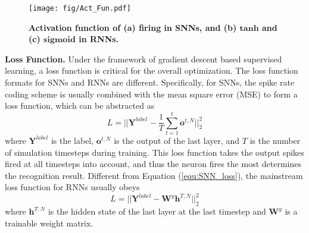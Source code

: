 \documentclass[journal,10pt,twocolumn]{IEEETran}
\begin{document}
\begin{figure}[!htbp]
\centering     
\texttt{[image: fig/Act\_Fun.pdf]}
\flushleft
\caption{\textbf{Activation function of (a) firing in SNNs, and (b) $\pmb{tanh}$ and (c) $\pmb{sigmoid}$ in RNNs.}} \label{fig:act_fun} 
\end{figure}

\begin{table*}[!htbp]
\caption{Summary of similarities and differences among SNNs, vanilla RNNs, and LSTM.}
\label{tab:simlarties_differences}
\vspace{2pt}
\centering
\renewcommand\arraystretch{1.5}
\end{table*}

\textbf{Loss Function.} Under the framework of gradient descent based supervised learning, a loss function is critical for the overall optimization. The loss function formats for SNNs and RNNs are different. Specifically, for SNNs, the spike rate coding scheme is usually combined with the mean square error (MSE) to form a loss function, which can be abstracted as
\begin{equation}
\label{equ:SNN_loss}
L = ||\pmb{Y}^{label}-\frac{1}{T}\sum_{t=1}^{t}\pmb{o}^{t,N}||_{2}^{2}
\end{equation}
where $\pmb{Y}^{label}$ is the label, $\pmb{o}^{t,N}$ is the output of the last layer, and $T$ is the number of simulation timesteps during training. This loss function takes the output spikes fired at all timesteps into account, and thus the neuron fires the most determines the recognition result. Different from Equation (\ref{equ:SNN_loss}), the mainstream loss function for RNNs usually obeys
\begin{equation}
\label{equ:RNN_loss1}
L = ||\pmb{Y}^{label}-\pmb{W}^y\pmb{h}^{T,N}||_{2}^{2}
\end{equation}
where $\pmb{h}^{T,N}$ is the hidden state of the last layer at the last timestep and $\pmb{W}^y$ is a trainable weight matrix.
\end{document}
